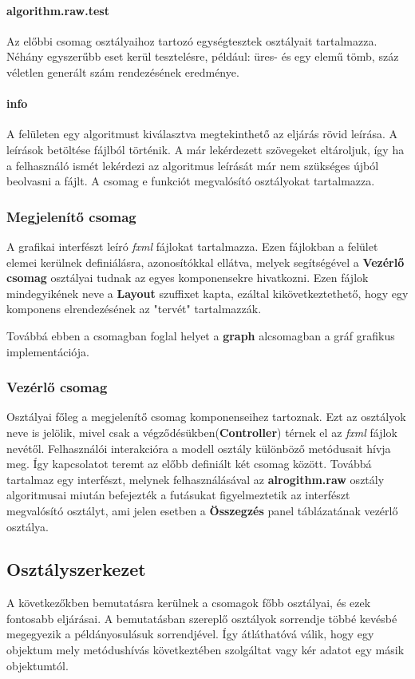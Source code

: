 \documentclass{elteikthesis}
\begin{document}
\paragraph{algorithm.raw.test}
Az előbbi csomag osztályaihoz tartozó egységtesztek osztályait tartalmazza. Néhány egyszerűbb eset kerül tesztelésre, például: üres- és egy elemű tömb, száz véletlen generált szám rendezésének eredménye.
\paragraph{info}
A felületen egy algoritmust kiválasztva megtekinthető az eljárás rövid leírása. A leírások betöltése fájlból történik. A már lekérdezett szövegeket eltároljuk, így ha a felhasználó ismét lekérdezi az algoritmus leírását már nem szükséges újból beolvasni a fájlt. A csomag e funkciót megvalósító osztályokat tartalmazza.

\subsubsection{Megjelenítő csomag}
A grafikai interfészt leíró \emph{fxml} fájlokat tartalmazza. Ezen fájlokban a felület elemei kerülnek definiálásra, azonosítókkal ellátva, melyek segítségével a \textbf{Vezérlő csomag} osztályai tudnak az egyes komponensekre hivatkozni. Ezen fájlok mindegyikének neve a \textbf{Layout} szuffixet kapta, ezáltal kikövetkeztethető, hogy egy komponens elrendezésének az "tervét" tartalmazzák.\par
Továbbá ebben a csomagban foglal helyet a \textbf{graph} alcsomagban a gráf grafikus implementációja.

\subsubsection{Vezérlő csomag}
Osztályai főleg a megjelenítő csomag komponenseihez tartoznak. Ezt az osztályok neve is jelölik, mivel csak a végződésükben(\textbf{Controller}) térnek el az \emph{fxml} fájlok nevétől. Felhasználói interakcióra a modell osztály különböző metódusait hívja meg. Így kapcsolatot teremt az előbb definiált két csomag között. Továbbá tartalmaz egy interfészt, melynek felhasználásával az \textbf{alrogithm.raw} osztály algoritmusai miután befejezték a futásukat figyelmeztetik az interfészt megvalósító osztályt, ami jelen esetben a \textbf{Összegzés} panel táblázatának vezérlő osztálya.

\subsection{Osztályszerkezet}
A következőkben bemutatásra kerülnek a csomagok főbb osztályai, és ezek fontosabb eljárásai. A bemutatásban szereplő osztályok sorrendje többé kevésbé megegyezik a példányosulásuk sorrendjével. Így átláthatóvá válik, hogy egy objektum mely metódushívás következtében szolgáltat vagy kér adatot egy másik objektumtól.
\end{document}
